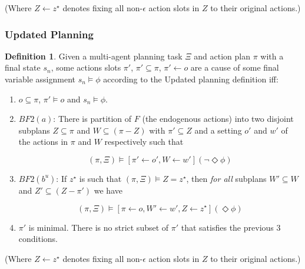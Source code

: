 \documentclass{article}
\theoremstyle{plain}
\theoremstyle{definition}
\newtheorem{defn}[thm]{Definition} %
\begin{document}
(Where $Z\leftarrow z^\star$ denotes fixing all non-$\epsilon$ action slots in $Z$ to their original actions.)



\subsubsection*{Updated Planning}
\begin{defn}
Given a multi-agent planning task $\Xi$ and action plan $\pi$ with a final state $s_n$, some actions slots $\pi'$, $\pi' \subseteq \pi$, $\pi' \leftarrow o$ are a cause of some final variable assignment $s_n \models \phi$ according to the Updated planning definition iff:
\begin{enumerate}
\item  $o \subseteq \pi$, $\pi' \models o$ and $s_n \models \phi$.



\item $BF2(a)$: There is partition of $F$ (the endogenous actions) into two disjoint subplans $Z \subseteq \pi$ and $W \subseteq (\pi - Z)$ with $\pi' \subseteq Z$ and a setting $o'$ and $w'$ of the actions in $\pi$ and $W$ respectively such that

\[
(\pi, \Xi) \models [\pi' \leftarrow o', W \leftarrow w'](\lnot \Diamond \phi)
\]

\item $BF2(b^u)$: If $z^\star$ is such that $(\pi, \Xi) \models Z = z^\star$, then \textit{for all} subplans $W' \subseteq W$ and $Z' \subseteq (Z - \pi')$ we have

\[
(\pi, \Xi) \models [\pi \leftarrow o, W' \leftarrow w', Z \leftarrow z^\star](\Diamond \phi)
\]

\item $\pi'$ is minimal. There is no strict subset of $\pi'$ that satisfies the previous 3 conditions.
\end{enumerate}
\end{defn}

(Where $Z\leftarrow z^\star$ denotes fixing all non-$\epsilon$ action slots in $Z$ to their original actions.)
\end{document}
